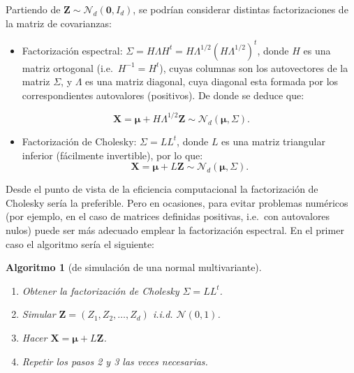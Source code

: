 \documentclass[
]{book}
\providecommand{\tightlist}{%
  \setlength{\itemsep}{0pt}\setlength{\parskip}{0pt}}
\theoremstyle{break}
\newtheorem{conjecture}{Algoritmo}[chapter]
\theoremstyle{definition}
\theoremstyle{definition}
\theoremstyle{definition}
\theoremstyle{definition}
\theoremstyle{remark}
\begin{document}
Partiendo de \(\mathbf{Z} \sim \mathcal{N}_d\left( \mathbf{0},I_d\right)\), se podrían considerar distintas factorizaciones de la matriz de covarianzas:

\begin{itemize}
\tightlist
\item
  Factorización espectral:
  \(\Sigma=H\Lambda H^t =H\Lambda^{1/2}(H\Lambda^{1/2})^t\),
  donde \(H\) es una matriz ortogonal (i.e.~\(H^{-1}=H^{t}\)), cuyas columnas son los autovectores de la matriz \(\Sigma\), y \(\Lambda\) es una matriz diagonal, cuya diagonal esta formada por los correspondientes autovalores (positivos). De donde se deduce que:
\end{itemize}

\[\mathbf{X} =\boldsymbol\mu + H\Lambda^{1/2}\mathbf{Z} \sim \mathcal{N}_d\left( \boldsymbol\mu,\Sigma \right).\]

\begin{itemize}
\tightlist
\item
  Factorización de Cholesky: \(\Sigma=LL^t\), donde \(L\) es una matriz triangular inferior (fácilmente invertible), por lo que:
  \[\mathbf{X} =\boldsymbol\mu + L\mathbf{Z} 
  \sim \mathcal{N}_d\left( \boldsymbol\mu,\Sigma \right).\]
\end{itemize}

Desde el punto de vista de la eficiencia computacional la factorización de Cholesky sería la preferible. Pero en ocasiones, para evitar problemas numéricos (por ejemplo, en el caso de matrices definidas positivas, i.e.~con autovalores nulos) puede ser más adecuado emplear la factorización espectral.
En el primer caso el algoritmo sería el siguiente:

\begin{conjecture}[de simulación de una normal multivariante]
\protect\hypertarget{cnj:mnorm-fact}{}{\label{cnj:mnorm-fact} {} }

\begin{enumerate}
\def\labelenumi{\arabic{enumi}.}
\item
  Obtener la factorización de Cholesky \(\Sigma=LL^t\).
\item
  Simular \(\mathbf{Z} =\left( Z_1,Z_2,\ldots,Z_d\right)\)
  i.i.d. \(\mathcal{N}\left( 0,1\right)\).
\item
  Hacer \(\mathbf{X} = \boldsymbol\mu + L\mathbf{Z}\).
\item
  Repetir los pasos 2 y 3 las veces necesarias.
\end{enumerate}
\end{conjecture}
\end{document}
